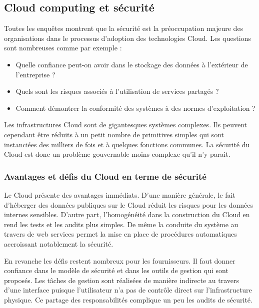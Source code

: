 \subsection{Cloud computing et sécurité
}
Toutes les enquêtes montrent que la sécurité est la préoccupation majeure des organisations dans le processus d’adoption des technologies Cloud. Les questions sont nombreuses comme par exemple :

\begin{itemize}

\item Quelle confiance peut-on avoir dans le stockage des données à l’extérieur de l’entreprise ?
\item Quels sont les risques associés à l’utilisation de services partagés ?
\item Comment démontrer la conformité des systèmes à des normes d’exploitation ?
\end{itemize}

Les infrastructures Cloud sont de gigantesques systèmes complexes. Ils peuvent cependant être réduits à un petit nombre de primitives simples qui sont instanciées des milliers de fois et à quelques fonctions communes. La sécurité du Cloud est donc un problème gouvernable moins complexe qu’il n’y parait.

\subsubsection{Avantages et défis du Cloud en terme de sécurité}

Le Cloud présente des avantages immédiats. D’une manière générale, le fait d’héberger des données publiques sur le Cloud réduit les risques pour les données internes sensibles. D’autre part, l’homogénéité dans la construction du Cloud en rend les tests et les audits plus simples. De même la conduite du système au travers de web services permet la mise en place  de procédures automatiques accroissant notablement la sécurité.

En revanche les défis restent nombreux pour les fournisseurs.  Il faut donner confiance dans le modèle de sécurité et dans les outils de gestion qui sont proposés. Les tâches de gestion sont réalisées de manière indirecte au travers d’une interface puisque l’utilisateur n’a pas de contrôle direct sur l’infrastructure physique. Ce partage des responsabilités complique un peu les audits de sécurité.

